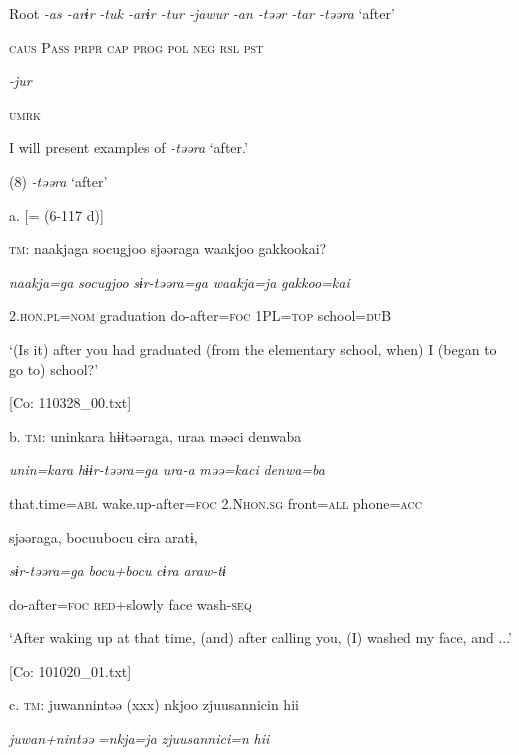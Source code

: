   Root  \textit{{}-as  {}-arɨr} %
\textit{{}-tuk  {}-arɨr  {}-tur  {}-jawur} %
\textit{{}-an  {}-təər  {}-tar  {}-təəra} ‘after’

    \textsc{caus}  P\textsc{ass}  \textsc{prpr}  \textsc{cap}  \textsc{prog}  \textsc{pol}  \textsc{neg}  \textsc{rsl}  \textsc{pst}

          \textit{{}-jur} 

          \textsc{umrk}

I will present examples of \textit{{}-təəra} ‘after.’

(8)  \textit{{}-təəra} ‘after’

  a.  [= (6-117 d)]

    \textsc{tm}:  naakjaga  {\textbar}socugjoo{\textbar}  sjəəraga  waakjoo  {\textbar}gakkoo{\textbar}kai?

      \textit{naakja=ga}  \textit{socugjoo}  \textit{sɨr-təəra=ga}  \textit{waakja=ja}  \textit{gakkoo=kai}

      2.\textsc{hon}.\textsc{pl}=\textsc{nom}  graduation  do-after=\textsc{foc}  1PL=\textsc{top}  school=\textsc{du}B

      ‘(Is it) after you had graduated (from the elementary school, when) I (began to go to) school?’

      [Co: 110328\_00.txt]

  b.  \textsc{tm}:  uninkara  hɨɨtəəraga,  uraa  məəci  {\textbar}denwa{\textbar}ba

      \textit{unin=kara}  \textit{hɨɨr-təəra=ga}  \textit{ura-a}  \textit{məə=kaci}  \textit{denwa=ba}

      that.time=\textsc{abl}  wake.up-after=\textsc{foc}  2.N\textsc{hon}.\textsc{sg}  front=\textsc{all}  phone=\textsc{acc}

      sjəəraga,  bocuubocu  cɨra  aratɨ,

      \textit{sɨr-təəra=ga}  \textit{bocu+bocu}  \textit{cɨra}  \textit{araw-tɨ}

      do-after=\textsc{foc}  \textsc{red}+slowly  face  wash-\textsc{seq}

      ‘After waking up at that time, (and) after calling you, (I) washed my face, and ...’

      [Co: 101020\_01.txt]

  c.  \textsc{tm}:  juwannintəə  (xxx)  nkjoo  {\textbar}zjuusannici{\textbar}n  hii

      \textit{juwan+nintəə}    \textit{=nkja=ja}  \textit{zjuusannici=n}  \textit{hii}

